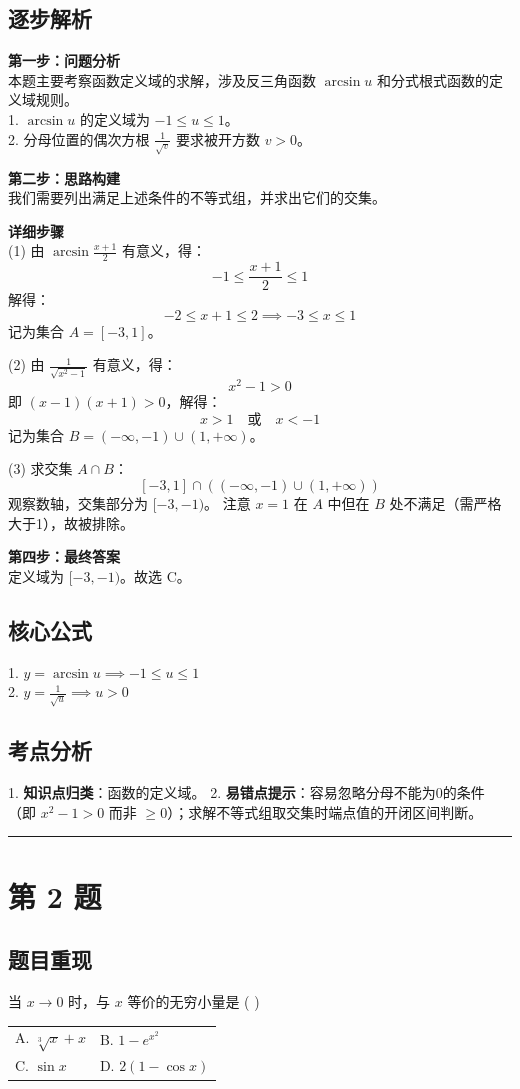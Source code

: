 \documentclass[10pt, a4paper]{ctexart}
\newcommand{\problemheader}{
    \vspace{0.5cm}
    \noindent\rule[0.5ex]{\linewidth}{2pt} %
}
\newcommand{\analysisheader}{
    \vspace{0.2cm}
    \noindent{\color{red}\rule[0.5ex]{\linewidth}{0.5pt}} %
    \vspace{0.1cm}
}
\begin{document}
\analysisheader
{\color{red}
\subsection*{逐步解析}
\textbf{第一步：问题分析} \\
本题主要考察函数定义域的求解，涉及反三角函数 $\arcsin u$ 和分式根式函数的定义域规则。 \\
1. $\arcsin u$ 的定义域为 $-1 \le u \le 1$。 \\
2. 分母位置的偶次方根 $\frac{1}{\sqrt{v}}$ 要求被开方数 $v > 0$。

\textbf{第二步：思路构建} \\
我们需要列出满足上述条件的不等式组，并求出它们的交集。

\textbf{详细步骤} \\
(1) 由 $\arcsin \frac{x+1}{2}$ 有意义，得：
\[ -1 \le \frac{x+1}{2} \le 1 \]
解得：
\[ -2 \le x+1 \le 2 \implies -3 \le x \le 1 \]
记为集合 $A = [-3, 1]$。

(2) 由 $\frac{1}{\sqrt{x^2-1}}$ 有意义，得：
\[ x^2 - 1 > 0 \]
即 $(x-1)(x+1) > 0$，解得：
\[ x > 1 \quad \text{或} \quad x < -1 \]
记为集合 $B = (-\infty, -1) \cup (1, +\infty)$。

(3) 求交集 $A \cap B$：
\[ [-3, 1] \cap \left( (-\infty, -1) \cup (1, +\infty) \right) \]
观察数轴，交集部分为 $[-3, -1)$。
注意 $x=1$ 在 $A$ 中但在 $B$ 处不满足（需严格大于1），故被排除。

\textbf{第四步：最终答案} \\
定义域为 $[-3, -1)$。故选 C。

\subsection*{核心公式}
1. $y = \arcsin u \implies -1 \le u \le 1$ \\
2. $y = \frac{1}{\sqrt{u}} \implies u > 0$

\subsection*{考点分析}
1. \textbf{知识点归类}：函数的定义域。
2. \textbf{易错点提示}：容易忽略分母不能为0的条件（即 $x^2-1 > 0$ 而非 $\ge 0$）；求解不等式组取交集时端点值的开闭区间判断。
}

\problemheader
\section*{第 2 题}
\subsection*{题目重现}
当 $x \to 0$ 时，与 $x$ 等价的无穷小量是 ( \quad ) \\
\begin{tabularx}{\linewidth}{@{} *{2}{X} @{}}
    A. $\sqrt[3]{x} + x$ & B. $1 - e^{x^2}$ \\
    C. $\sin x$        & D. $2(1-\cos x)$
\end{tabularx}
\end{document}
